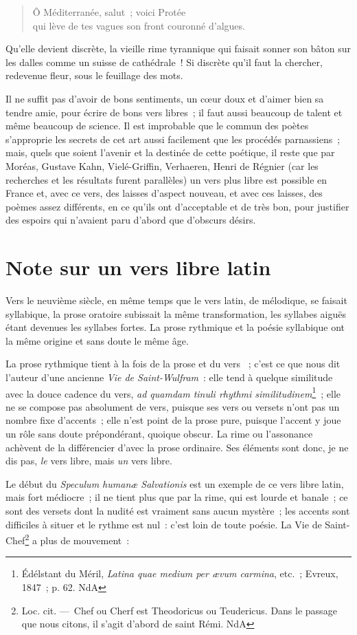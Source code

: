 \documentclass[french,twoside]{book} %
\begin{document}
\begin{verse}
Ô Méditerranée, salut ; voici Protée\\
qui lève de tes vagues son front couronné d’algues.\\
\end{verse}

\noindent Qu’elle devient discrète, la vieille rime tyrannique qui faisait sonner son bâton sur les dalles comme un suisse de cathédrale ! Si discrète qu’il faut la chercher, redevenue fleur, sous le feuillage des mots.\par
Il ne suffit pas d’avoir de bons sentiments, un cœur doux et d’aimer bien sa tendre amie, pour écrire de bons vers libres ; il faut aussi beaucoup de talent et même beaucoup de science. Il est improbable que le commun des poètes s’approprie les secrets de cet art aussi facilement que les procédés parnassiens ; mais, quels que soient l’avenir et la destinée de cette poétique, il reste que par Moréas, Gustave Kahn, Vielé-Griffin, Verhaeren, Henri de Régnier (car les recherches et les résultats furent parallèles) un vers plus libre est possible en France et, avec ce vers, des laisses d’aspect nouveau, et avec ces laisses, des poèmes assez différents, en ce qu’ils ont d’acceptable et de très bon, pour justifier des espoirs qui n’avaient paru d’abord que d’obscurs désirs.
\section[{Note sur un vers libre latin}]{Note sur un vers libre latin }
\noindent Vers le neuvième siècle, en même temps que le vers latin, de mélodique, se faisait syllabique, la prose oratoire subissait la même transformation, les syllabes aiguës étant devenues les syllabes fortes. La prose rythmique et la poésie syllabique ont la même origine et sans doute le même âge.\par
La prose rythmique tient à la fois de la prose et du vers  ; c’est ce que nous dit l’auteur d’une ancienne {\itshape Vie de Saint-Wulfram} : elle tend à quelque similitude avec la douce cadence du vers, {\itshape ad quamdam tinuli rhythmi similitudinem}\footnote{Édélstant du Méril, {\itshape Latina quae medium per ævum carmina}, etc. ; Evreux, 1847 ; p. 62. NdA} ; elle ne se compose pas absolument de vers, puisque ses vers ou versets n’ont pas un nombre fixe d’accents ; elle n’est point de la prose pure, puisque l’accent y joue un rôle sans doute prépondérant, quoique obscur. La rime ou l’assonance achèvent de la différencier d’avec la prose ordinaire. Ses éléments sont donc, je ne dis pas, {\itshape le} vers libre, mais {\itshape un} vers libre.\par
Le début du {\itshape Speculum humanæ Salvationis} est un exemple de ce vers libre latin, mais fort médiocre ; il ne tient plus que par la rime, qui est lourde et banale ; ce sont des versets dont la nudité est vraiment sans aucun mystère ; les accents sont difficiles à situer et le rythme est nul : c’est loin de toute poésie. La Vie de Saint-Chef\footnote{Loc. cit. — Chef ou Cherf est Theodoricus ou Teudericus. Dans le passage que nous citons, il s’agit d’abord de saint Rémi. NdA} a plus de mouvement :\par
\end{document}
